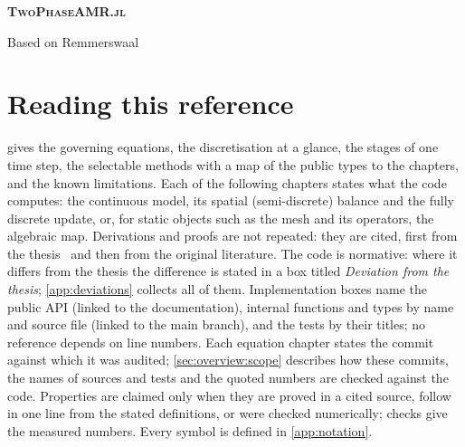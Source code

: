 \documentclass[10pt,twoside,openright]{memoir}
\DeclareRobustCommand\code[1]{\texttt{\detokenize{#1}}}
\newcounter{deviation}[chapter]
\begin{document}
\begin{titlingpage}
  \centering\vspace*{4cm}
  {\Huge\bfseries\scshape TwoPhaseAMR.jl\par}
  \vspace{0.8cm}{\Large\scshape Technical reference\par}
  \vspace{1cm}{\large The implemented equations, in the notation of the thesis\par}
  \vfill
  {\large Based on Remmerswaal~\cite{remmerswaal2023}\par}
  \vspace{2cm}
\end{titlingpage}
\frontmatter
\tableofcontents*
\chapter*{Reading this reference}
 gives the governing equations, the discretisation at a
glance, the stages of one time step, the selectable methods with a map of the
public types to the chapters, and the known limitations. Each of the
following chapters states what the code computes: the continuous model, its
spatial (semi-discrete) balance and the fully discrete update, or, for static
objects such as the mesh and its operators, the algebraic map. Derivations
and proofs are not repeated: they are cited, first from the
thesis~\cite{remmerswaal2023} and then from the original literature. The code
is normative: where it differs from the thesis the difference is stated in a
box titled \emph{Deviation from the thesis}; \cref{app:deviations} collects
all of them. Implementation boxes name the public API (linked to the
documentation), internal functions and types by name and source file (linked
to the main branch), and the tests by their \code{@testset} titles; no
reference depends on line numbers. Each equation chapter states the commit
against which it was audited; \cref{sec:overview:scope} describes how these
commits, the names of sources and tests and the quoted numbers are checked
against the code. Properties are claimed only when they are proved in a cited
source, follow in one line from the stated definitions, or were checked
numerically; checks give the measured numbers. Every symbol is defined in
\cref{app:notation}.
\mainmatter














\appendix



\backmatter


\end{document}
